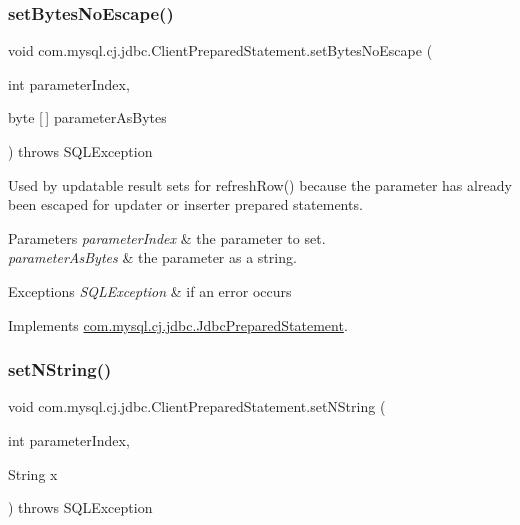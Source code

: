 \subsubsection{\texorpdfstring{set\+Bytes\+No\+Escape()}{setBytesNoEscape()}}
{\footnotesize\ttfamily void com.\+mysql.\+cj.\+jdbc.\+Client\+Prepared\+Statement.\+set\+Bytes\+No\+Escape (\begin{DoxyParamCaption}\item[{int}]{parameter\+Index,  }\item[{byte \mbox{[}$\,$\mbox{]}}]{parameter\+As\+Bytes }\end{DoxyParamCaption}) throws S\+Q\+L\+Exception}

Used by updatable result sets for refresh\+Row() because the parameter has already been escaped for updater or inserter prepared statements.


\begin{DoxyParams}{Parameters}
{\em parameter\+Index} & the parameter to set. \\
\hline
{\em parameter\+As\+Bytes} & the parameter as a string.\\
\hline
\end{DoxyParams}

\begin{DoxyExceptions}{Exceptions}
{\em S\+Q\+L\+Exception} & if an error occurs \\
\hline
\end{DoxyExceptions}


Implements \mbox{\hyperlink{interfacecom_1_1mysql_1_1cj_1_1jdbc_1_1_jdbc_prepared_statement_a46f072b1d5f3463b8371262dc5ed9ead}{com.\+mysql.\+cj.\+jdbc.\+Jdbc\+Prepared\+Statement}}.

\mbox{\label{classcom_1_1mysql_1_1cj_1_1jdbc_1_1_client_prepared_statement_a08a3846968d31fb8c91cb4cb384cd545}} 
\subsubsection{\texorpdfstring{set\+N\+String()}{setNString()}}
{\footnotesize\ttfamily void com.\+mysql.\+cj.\+jdbc.\+Client\+Prepared\+Statement.\+set\+N\+String (\begin{DoxyParamCaption}\item[{int}]{parameter\+Index,  }\item[{String}]{x }\end{DoxyParamCaption}) throws S\+Q\+L\+Exception}

